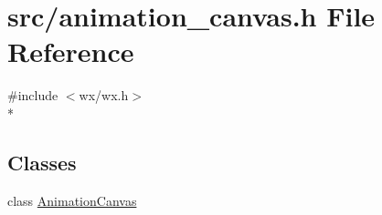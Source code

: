 \hypertarget{a00169}{\section{src/animation\-\_\-canvas.h File Reference}
\label{a00169}
}
{\ttfamily \#include $<$wx/wx.\-h$>$}\\*
\subsection*{Classes}
\begin{DoxyCompactItemize}
\item 
class \hyperlink{a00011}{Animation\-Canvas}
\end{DoxyCompactItemize}
